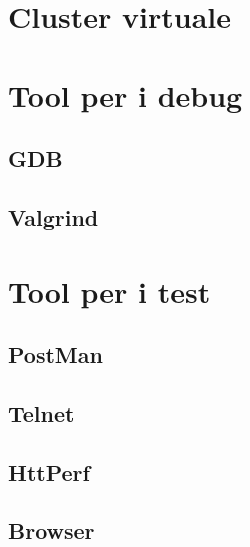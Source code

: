 \documentclass[italian]{tktltiki2}
\begin{document}
\section{Cluster virtuale}

\section{Tool per i debug}
\subsection{GDB}
\subsection{Valgrind}

\section{Tool per i test}
\subsection{PostMan}
\subsection{Telnet}
\subsection{HttPerf}
\subsection{Browser}
\end{document}
